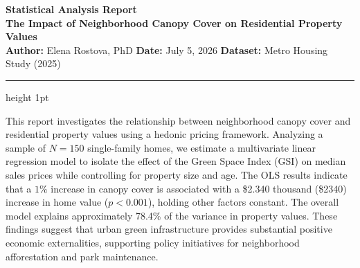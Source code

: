 \documentclass[11pt,letterpaper]{article}
\begin{document}
\begin{center}
    {\sffamily\Huge\bfseries\color{accent} Statistical Analysis Report} \\[0.25cm]
    {\sffamily\large\bfseries The Impact of Neighborhood Canopy Cover on Residential Property Values} \\[0.4cm]
    {\sffamily\normalsize \textbf{Author:} Elena Rostova, PhD \quad \textbf{Date:} July 5, 2026 \quad \textbf{Dataset:} Metro Housing Study (2025)}
\end{center}
\vspace{0.05cm}
\hrule height 1pt
\vspace{0.25cm}

\begin{summarybox}
This report investigates the relationship between neighborhood canopy cover and residential property values using a hedonic pricing framework. Analyzing a sample of $N = \num{150}$ single-family homes, we estimate a multivariate linear regression model to isolate the effect of the Green Space Index (GSI) on median sales prices while controlling for property size and age. The OLS results indicate that a $1\%$ increase in canopy cover is associated with a \$\num{2.340} thousand (\$\num{2340}) increase in home value ($p < \num{0.001}$), holding other factors constant. The overall model explains approximately \num{78.4}\% of the variance in property values. These findings suggest that urban green infrastructure provides substantial positive economic externalities, supporting policy initiatives for neighborhood afforestation and park maintenance.
\end{summarybox}







\end{document}
